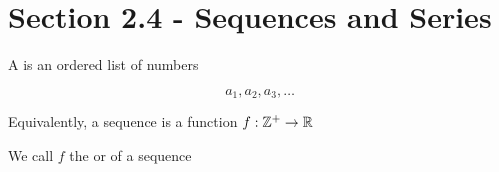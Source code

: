 \documentclass[../../Main.tex]{subfiles}
\begin{document}
\section{Section 2.4 - Sequences and Series}

\begin{definition}

    A  is an ordered list of numbers

    $$a_1, a_2, a_3, \ldots$$

    Equivalently, a sequence is a function $f: \mathbb{Z}^+ \to \mathbb{R}$

    We call $f$ the  or  of a sequence

\end{definition}
\end{document}
